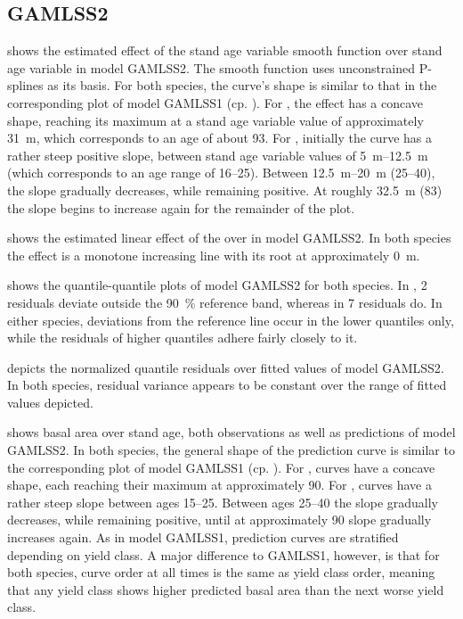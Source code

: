 \subsection{GAMLSS2}

 shows the estimated effect of the stand age variable smooth function over stand age variable in model GAMLSS2.  The smooth function uses unconstrained P-splines as its basis.  For both species, the curve’s shape is similar to that in the corresponding plot of model GAMLSS1 (cp. ).  For \Beech{}, the effect has a concave shape, reaching its maximum at a stand age variable value of approximately \SI{31}{\meter}, which corresponds to an age of about \SI{93}{\year}.  For \Spruce{}, initially the curve has a rather steep positive slope, between stand age variable values of \SIrange{5}{12.5}{\meter} (which corresponds to an age range of \SIrange{16}{25}{\year}).  Between \SIrange{12.5}{20}{\meter} (\SIrange{25}{40}{\year}), the slope gradually decreases, while remaining positive. At roughly \SI{32.5}{\meter} (\SI{83}{\year}) the slope begins to increase again for the remainder of the plot.

 shows the estimated linear effect of the \ProductivityIndexVariableText{} over \ProductivityIndexVariableText{} in model GAMLSS2.  In both species the effect is a monotone increasing line with its root at approximately \SI{0}{\meter}.

 shows the quantile-quantile plots of model GAMLSS2 for both species.  In \Beech{}, 2 residuals deviate outside the \SI{90}{\percent} reference band, whereas in \Spruce{} 7 residuals do.  In either species, deviations from the reference line occur in the lower quantiles only, while the residuals of higher quantiles adhere fairly closely to it.

 depicts the normalized quantile residuals over fitted values of model GAMLSS2.  In both species, residual variance appears to be constant over the range of fitted values depicted.

 shows basal area over stand age, both observations as well as predictions of model GAMLSS2.  In both species, the general shape of the prediction curve is similar to the corresponding plot of model GAMLSS1 (cp. ).  For \Beech{}, curves have a concave shape, each reaching their maximum at approximately \SI{90}{\year}.  For \Spruce{}, curves have a rather steep slope between ages \SIrange{15}{25}{\year}.  Between ages \SIrange{25}{40}{\year} the slope gradually decreases, while remaining positive, until at approximately \SI{90}{\year} slope gradually increases again.  As in model GAMLSS1, prediction curves are stratified depending on yield class.  A major difference to GAMLSS1, however, is that for both species, curve order at all times is the same as yield class order, meaning that any yield class shows higher predicted basal area than the next worse yield class.

